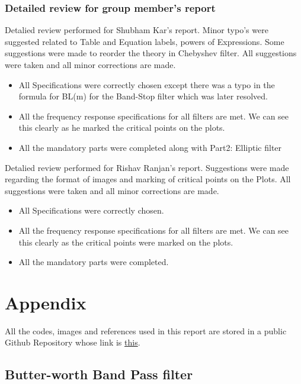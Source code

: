 \documentclass[12pt]{article}
\begin{document}
\color{darkblue}
\subsubsection{Detailed review for group member's report}
\color{black}
Detalied review performed for Shubham Kar's report. Minor typo's were suggested related to Table and Equation labels, powers of Expressions. Some suggestions were made to reorder the theory in Chebyshev filter. All suggestions were taken and all minor corrections are made.
\begin{itemize}
	\item All Specifications were correctly chosen except there was a typo in the formula for BL(m) for the Band-Stop filter which was later resolved.
	\item All the frequency response specifications for all filters are met. We can see this clearly as he marked the critical points on the plots.
	\item All the mandatory parts were completed along with Part2: Elliptic filter\\
\end{itemize}

\noindent Detalied review performed for Rishav Ranjan's report. Suggestions were made regarding the format of images and marking of critical points on the Plots. All suggestions were taken and all minor corrections are made.
\begin{itemize}
	\item All Specifications were correctly chosen.
	\item All the frequency response specifications for all filters are met. We can see this clearly as the critical points were marked on the plots.
	\item All the mandatory parts were completed.\\
\end{itemize}


\color{darkblue}
\section{Appendix}
\color{black}
All the codes, images and references used in this report are stored in a public Github Repository whose link is  \color{darkblue}\href{https://github.com/VamsiGaraga/EE338_Filter_Design_Assignment}{this}. 

\color{darkblue}
\subsection{Butter-worth Band Pass filter}
\color{black}
\end{document}
